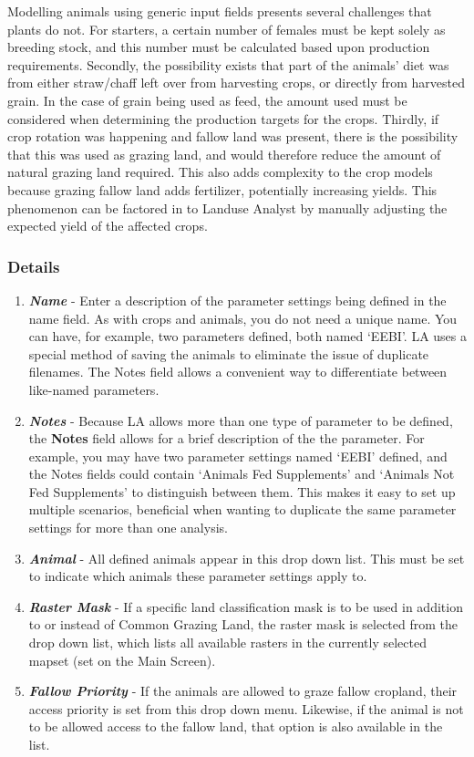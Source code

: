 Modelling animals using generic input fields presents several challenges that plants do not. For starters, a certain number of females must be kept solely as breeding stock, and this number must be calculated based upon production requirements. Secondly, the possibility exists that part of the animals' diet was from either straw/chaff left over from harvesting crops, or directly from harvested grain. In the case of grain being used as feed, the amount used must be considered when determining the production targets for the crops. Thirdly, if crop rotation was happening and fallow land was present, there is the possibility that this was used as grazing land, and would therefore reduce the amount of natural grazing land required. This also adds complexity to the crop models because grazing fallow land adds fertilizer, potentially increasing yields. This phenomenon can be factored in to Landuse Analyst by manually adjusting the expected yield of the affected crops.

\subsubsection{Details}
\begin{enumerate}
 	\item \textit{\textbf{Name}} - Enter a description of the parameter settings being defined in the name field. As with crops and animals, you do not need a unique name. You can have, for example, two parameters defined, both named `EEBI'. LA uses a special method of saving the animals to eliminate the issue of duplicate filenames. The Notes field allows a convenient way to differentiate between like-named parameters. 
	\item \textit{\textbf{Notes}} - Because LA allows more than one type of parameter to be defined, the \textbf{Notes} field allows for a brief description of the the parameter. For example, you may have two parameter settings named  `EEBI' defined, and the Notes fields could contain `Animals Fed Supplements' and `Animals Not Fed Supplements' to distinguish between them.  This makes it easy to set up multiple scenarios, beneficial when wanting to duplicate the same parameter settings for more than one analysis.
  \item \textit{\textbf{Animal}} - All defined animals appear in this drop down list.  This must be set to indicate which animals these parameter settings apply to.
  \item \textit{\textbf{Raster Mask}} - If a specific land classification mask is to be used in addition to or instead of Common Grazing Land, the raster mask is selected from the drop down list, which lists all available rasters in the currently selected mapset (set on the Main Screen).
  \item \textit{\textbf{Fallow Priority}} - If the animals are allowed to graze fallow cropland, their access priority is set from this drop down menu.  Likewise, if the animal is not to be allowed access to the fallow land, that option is also available in the list.
\end{enumerate}

